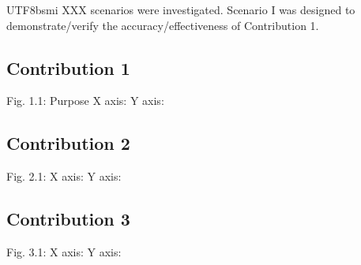 \documentclass[conference]{IEEEtran}
\begin{document}
\begin{CJK}{UTF8}{bsmi}
XXX scenarios were investigated. Scenario I was designed to demonstrate/verify the accuracy/effectiveness of Contribution 1.

\subsection{Contribution 1}
Fig. 1.1: Purpose
    X axis: 
    Y axis:
\subsection{Contribution 2}
Fig. 2.1: 
    X axis: 
    Y axis:
\subsection{Contribution 3}
Fig. 3.1: 
    X axis: 
    Y axis:


\end{CJK}\
\end{document}

